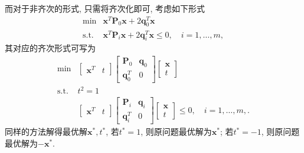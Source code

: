 \documentclass{article}
\begin{document}
而对于非齐次的形式, 只需将齐次化即可, 考虑如下形式
\begin{equation}
\begin{array}{cl}
{\min} & {\bm{x}^T \bm{P}_0 \bm{x} + 2 \bm{q}_0^T \bm{x}} \\
{\text{s.t.}} & {\bm{x}^T\bm{P}_i \bm{x} + 2 \bm{q}_i^T \bm{x} \leq 0,\quad i=1,\dots,m},
\end{array}
\end{equation}
其对应的齐次形式可写为
\begin{equation}
\begin{array}{cl}
{\min} & {\begin{bmatrix} {\bm {x}^T} & { t } \end{bmatrix} 
\begin{bmatrix} {\bm{P}_0 } & {\bm{q}_0} \\ {\bm{q }_0^{ T }} & {0} \end{bmatrix} 
\begin{bmatrix} {\bm{x} } \\ {t} \end{bmatrix} } \\
{\text{s.t.}} & t^2=1 \\
{} & {\begin{bmatrix} {\bm {x}^T} & { t } \end{bmatrix} 
\begin{bmatrix} {\bm{P}_i } & {\bm{q}_i} \\ {\bm{q }_i^{ T }} & {0} \end{bmatrix} 
\begin{bmatrix} {\bm{x} } \\ {t} \end{bmatrix} \leq 0,\quad i=1,\dots,m,}.
\end{array}
\end{equation}
同样的方法解得最优解$\bm{x}^*,t^*$, 若$t^*=1$, 则原问题最优解为$\bm{x}^*$; 若$t^*=-1$, 则原问题最优解为$-\bm{x}^*$.
\end{document}
